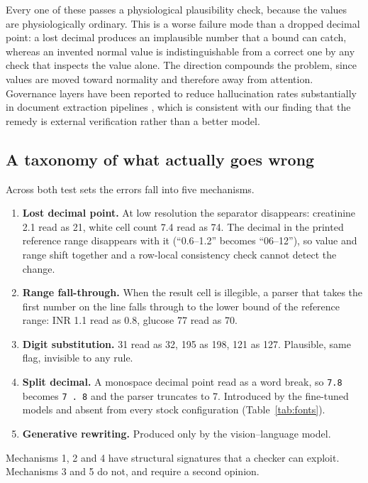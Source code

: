 \documentclass[11pt]{article}
\begin{document}
Every one of these passes a physiological plausibility check, because the values are
physiologically ordinary. This is a worse failure mode than a dropped decimal point: a lost
decimal produces an implausible number that a bound can catch, whereas an invented normal value
is indistinguishable from a correct one by any check that inspects the value alone. The
direction compounds the problem, since values are moved toward normality and therefore away from
attention. Governance layers have been reported to reduce hallucination rates substantially in
document extraction pipelines \citep{sediqin2026sage}, which is consistent with our finding that
the remedy is external verification rather than a better model.

\subsection{A taxonomy of what actually goes wrong}

Across both test sets the errors fall into five mechanisms.

\begin{enumerate}
\item \textbf{Lost decimal point.} At low resolution the separator disappears: creatinine
2.1 read as 21, white cell count 7.4 read as 74. The decimal in the printed reference range
disappears with it (``0.6--1.2'' becomes ``06--12''), so value and range shift together and a
row-local consistency check cannot detect the change.
\item \textbf{Range fall-through.} When the result cell is illegible, a parser that takes the
first number on the line falls through to the lower bound of the reference range: INR 1.1 read
as 0.8, glucose 77 read as 70.
\item \textbf{Digit substitution.} 31 read as 32, 195 as 198, 121 as 127. Plausible, same flag,
invisible to any rule.
\item \textbf{Split decimal.} A monospace decimal point read as a word break, so
\texttt{7.8} becomes \texttt{7 . 8} and the parser truncates to 7. Introduced by the
fine-tuned models and absent from every stock configuration (Table~\ref{tab:fonts}).
\item \textbf{Generative rewriting.} Produced only by the vision--language model.
\end{enumerate}

Mechanisms 1, 2 and 4 have structural signatures that a checker can exploit. Mechanisms 3 and 5
do not, and require a second opinion.
\end{document}

